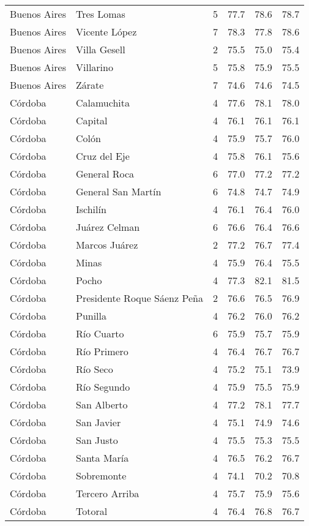 \documentclass[12pt,spanish,]{article}
\begin{document}
\begin{landscape}
\begin{longtable}[t]{llrrrr}
Buenos Aires & Tres Lomas & 5 & 77.7 & 78.6 & 78.7\\
Buenos Aires & Vicente López & 7 & 78.3 & 77.8 & 78.6\\
\addlinespace
Buenos Aires & Villa Gesell & 2 & 75.5 & 75.0 & 75.4\\
Buenos Aires & Villarino & 5 & 75.8 & 75.9 & 75.5\\
Buenos Aires & Zárate & 7 & 74.6 & 74.6 & 74.5\\
Córdoba & Calamuchita & 4 & 77.6 & 78.1 & 78.0\\
Córdoba & Capital & 4 & 76.1 & 76.1 & 76.1\\
\addlinespace
Córdoba & Colón & 4 & 75.9 & 75.7 & 76.0\\
Córdoba & Cruz del Eje & 4 & 75.8 & 76.1 & 75.6\\
Córdoba & General Roca & 6 & 77.0 & 77.2 & 77.2\\
Córdoba & General San Martín & 6 & 74.8 & 74.7 & 74.9\\
Córdoba & Ischilín & 4 & 76.1 & 76.4 & 76.0\\
\addlinespace
Córdoba & Juárez Celman & 6 & 76.6 & 76.4 & 76.6\\
Córdoba & Marcos Juárez & 2 & 77.2 & 76.7 & 77.4\\
Córdoba & Minas & 4 & 75.9 & 76.4 & 75.5\\
Córdoba & Pocho & 4 & 77.3 & 82.1 & 81.5\\
Córdoba & Presidente Roque Sáenz Peña & 2 & 76.6 & 76.5 & 76.9\\
\addlinespace
Córdoba & Punilla & 4 & 76.2 & 76.0 & 76.2\\
Córdoba & Río Cuarto & 6 & 75.9 & 75.7 & 75.9\\
Córdoba & Río Primero & 4 & 76.4 & 76.7 & 76.7\\
Córdoba & Río Seco & 4 & 75.2 & 75.1 & 73.9\\
Córdoba & Río Segundo & 4 & 75.9 & 75.5 & 75.9\\
\addlinespace
Córdoba & San Alberto & 4 & 77.2 & 78.1 & 77.7\\
Córdoba & San Javier & 4 & 75.1 & 74.9 & 74.6\\
Córdoba & San Justo & 4 & 75.5 & 75.3 & 75.5\\
Córdoba & Santa María & 4 & 76.5 & 76.2 & 76.7\\
Córdoba & Sobremonte & 4 & 74.1 & 70.2 & 70.8\\
\addlinespace
Córdoba & Tercero Arriba & 4 & 75.7 & 75.9 & 75.6\\
Córdoba & Totoral & 4 & 76.4 & 76.8 & 76.7\\

\end{longtable}
\end{landscape}
\end{document}
